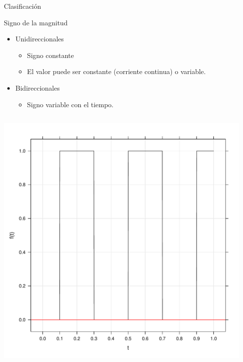 \documentclass[aspectratio=169, usenames,svgnames,dvipsnames]{beamer}
\begin{document}
\begin{frame}[label={sec:org7e2fa0b}]{Clasificación}
\begin{block}{Signo de la magnitud}
\begin{itemize}
\item Unidireccionales
\begin{itemize}
\item Signo constante
\item El valor puede ser constante (corriente continua) o variable.
\end{itemize}
\item Bidireccionales
\begin{itemize}
\item Signo variable con el tiempo.
\end{itemize}
\end{itemize}
\end{block}
\begin{columns}
\begin{column}{0.5\columnwidth}
\begin{center}
\includegraphics[height=0.52\textheight]{../figs/cuadrada0_periodica.pdf}
\end{center}
\end{column}
\begin{column}{0.5\columnwidth}
\begin{center}

\end{center}
\end{column}
\end{columns}
\end{frame}
\end{document}
